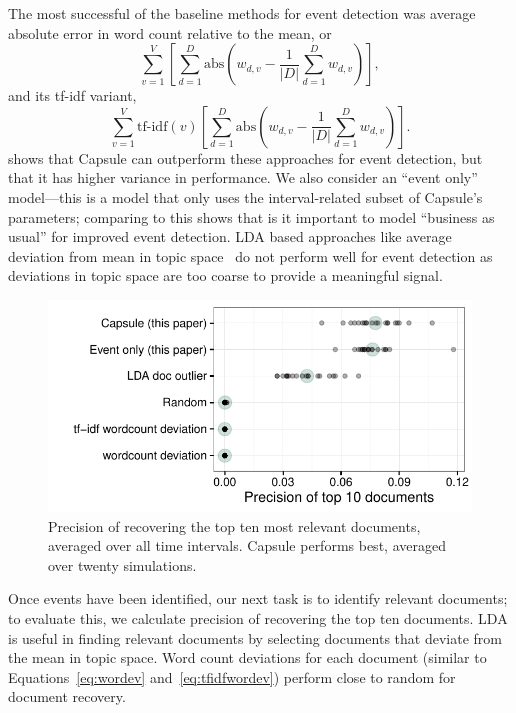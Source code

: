 The most successful of the baseline methods for event detection was average absolute error in word count relative to the mean, or
\begin{equation}
	\sum_{v=1}^V\left[\sum_{d=1}^D \mbox{abs}\left( w_{d,v} - \frac{1}{\vert D \vert}\sum_{d=1}^D w_{d,v} \right) \right],
\label{eq:wordev}
\end{equation}
and its tf-idf variant, 
\begin{equation}
	\sum_{v=1}^V\mbox{tf-idf}(v)\left[\sum_{d=1}^D \mbox{abs}\left( w_{d,v} - \frac{1}{\vert D \vert}\sum_{d=1}^D w_{d,v} \right) \right].
\label{eq:tfidfwordev}
\end{equation}
 shows that Capsule can outperform these approaches for event detection, but that it has higher variance in performance.  We also consider an ``event only'' model---this is a model that only uses the interval-related subset of Capsule's parameters; comparing to this shows that is it important to model ``business as usual'' for improved event detection.  LDA based approaches like average deviation from mean in topic space~\cite{dou2012leadline} do not perform well for event detection as deviations in topic space are too coarse to provide a meaningful signal.

\begin{figure}[h]
\centering
\includegraphics[width=\linewidth]{fig/precision10.pdf}
\caption{Precision of recovering the top ten most relevant documents, averaged over all time intervals.  Capsule performs best, averaged over twenty simulations.}
\label{fig:sim_precision}
\end{figure}

Once events have been identified, our next task is to identify relevant documents; to evaluate this, we calculate precision of recovering the top ten documents.  LDA is useful in finding relevant documents by selecting documents that deviate from the mean in topic space.  Word count deviations for each document (similar to Equations~\ref{eq:wordev} and~\ref{eq:tfidfwordev}) perform close to random for document recovery.

